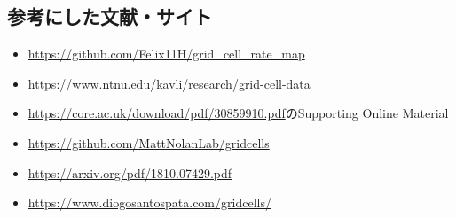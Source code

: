 \subsection{参考にした文献・サイト}
\begin{itemize}
\item \url{https://github.com/Felix11H/grid_cell_rate_map}
\item \url{https://www.ntnu.edu/kavli/research/grid-cell-data}
\item \url{https://core.ac.uk/download/pdf/30859910.pdf}のSupporting Online Material
\item \url{https://github.com/MattNolanLab/gridcells}
\item \url{https://arxiv.org/pdf/1810.07429.pdf}
\item \url{https://www.diogosantospata.com/gridcells/}
\end{itemize}
